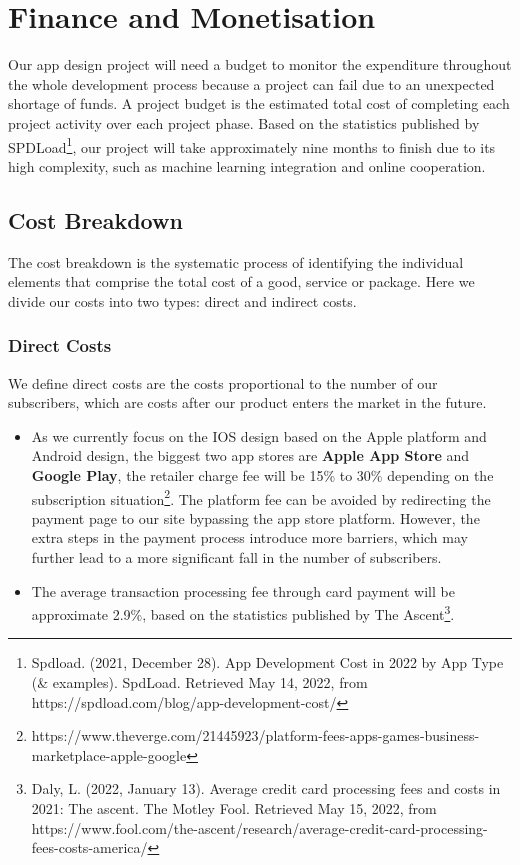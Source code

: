 \section{Finance and Monetisation}
\label{sec:Finance and Monetisation}
Our app design project will need a budget to monitor the expenditure throughout the whole development process because a project can fail due to an unexpected shortage of funds. A project budget is the estimated total cost of completing each project activity over each project phase. Based on the statistics published by SPDLoad\footnote{Spdload. (2021, December 28). App Development Cost in 2022 by App Type (\& examples). SpdLoad. Retrieved May 14, 2022, from https://spdload.com/blog/app-development-cost/}, our project will take approximately nine months to finish due to its high complexity, such as machine learning integration and online cooperation.
\subsection{Cost Breakdown}
The cost breakdown is the systematic process of identifying the individual elements that comprise the total cost of a good, service or package. Here we divide our costs into two types: direct and indirect costs.
\subsubsection{Direct Costs}
We define direct costs are the costs proportional to the number of our subscribers, which are costs after our product enters the market in the future.
\begin{itemize}
\item As we currently focus on the IOS design based on the Apple platform and Android design, the biggest two app stores are \textbf{Apple App Store} and \textbf{Google Play}, the retailer charge fee will be 15\% to 30\% depending on the subscription situation\footnote{https://www.theverge.com/21445923/platform-fees-apps-games-business-marketplace-apple-google}. The platform fee can be avoided by redirecting the payment page to our site bypassing the app store platform. However, the extra steps in the payment process introduce more barriers, which may further lead to a more significant fall in the number of subscribers.
\item The average transaction processing fee through card payment will be approximate 2.9\%, based on the statistics published by The Ascent\footnote{Daly, L. (2022, January 13). Average credit card processing fees and costs in 2021: The ascent. The Motley Fool. Retrieved May 15, 2022, from https://www.fool.com/the-ascent/research/average-credit-card-processing-fees-costs-america/}.
\end{itemize}


